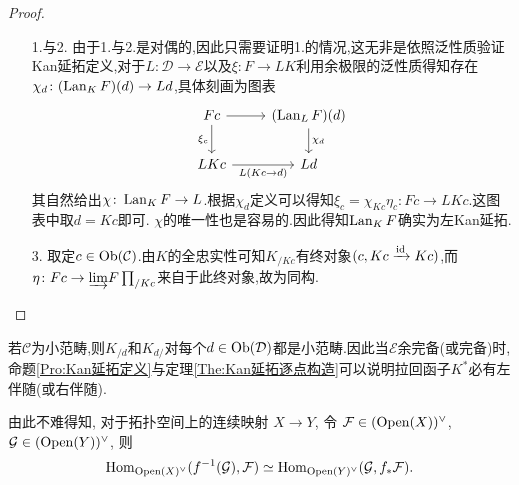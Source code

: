 \begin{proof}
    \begin{enumerate}
        \item[1.与2.]由于1.与2.是对偶的,因此只需要证明1.的情况,这无非是依照泛性质验证Kan延拓定义,对于$L\colon \mathcal{D} \to \mathcal{E}$以及$\xi \colon F \to LK$利用余极限的泛性质得知存在$\chi_d \colon (\operatorname{Lan}_K F )(d) \to Ld$,具体刻画为图表
        \[\begin{tikzcd}
	Fc & {(\Lan_L F)(d)} \\
	LKc & Ld
	\arrow[from=1-1, to=1-2]
	\arrow["{\xi_c}"', from=1-1, to=2-1]
	\arrow["{\chi_d}", from=1-2, to=2-2]
	\arrow["{L(Kc \to d)}"', from=2-1, to=2-2]
        \end{tikzcd}\]
        其自然给出$\chi \colon \operatorname{Lan}_K F \to L$.根据$\chi_d$定义可以得知$\xi_c = \chi_{Kc}\eta_c \colon Fc \to LKc$.这图表中取$d = Kc$即可. $\chi$的唯一性也是容易的.因此得知$\operatorname{Lan}_K F$确实为左Kan延拓.
        \item[3.] 取定$c\in \operatorname{Ob}(\mathcal{C})$.由$K$的全忠实性可知$K_{/Kc}$有终对象$(c, Kc \xrightarrow{\mathrm{id}} Kc)$,而$\eta \colon Fc \to \underrightarrow{\lim} F \prod_{/Kc}$来自于此终对象,故为同构.
    \end{enumerate}
\end{proof}
\begin{remark}\label{Rk:拉回函子左右伴随}
    若$\mathcal{C}$为小范畴,则$K_{/d}$和$K_{d/}$对每个$d \in \operatorname{Ob}(\mathcal{D})$都是小范畴.因此当$\mathcal{E}$余完备(或完备)时,命题\ref{Pro:Kan延拓定义}与定理\ref{The:Kan延拓逐点构造}可以说明拉回函子$K^*$必有左伴随(或右伴随).
\end{remark}
\begin{remark}
    由此不难得知, 对于拓扑空间上的连续映射 $X \to Y$, 令 $\mathcal{F}\in (\operatorname{Open}(X))^{\vee}$, $\mathcal{G}\in (\operatorname{Open}(Y))^{\vee}$, 则 
    \[
    \operatorname{Hom}_{\operatorname{Open}(X)^{\vee}}(f^{-1}(\mathcal{G}),\mathcal{F}) \simeq \operatorname{Hom}_{\operatorname{Open}(Y)^{\vee}}(\mathcal{G},f_*\mathcal{F}).
    \]
\end{remark}
